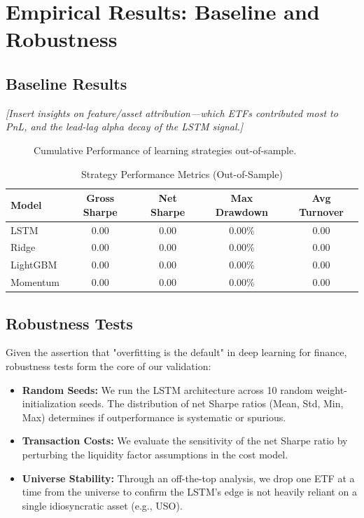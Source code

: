 \documentclass[a4paper,oneside]{scrbook}
\begin{document}
\section{Empirical Results: Baseline and Robustness}

\subsection{Baseline Results}
\textit{[Insert insights on feature/asset attribution—which ETFs contributed most to PnL, and the lead-lag alpha decay of the LSTM signal.]}

\begin{figure}[htbp]
  \centering
  \caption{Cumulative Performance of learning strategies out-of-sample.}
  \label{fig:pnl}
\end{figure}

\begin{table}[h]
\centering
\caption{Strategy Performance Metrics (Out-of-Sample)}
\begin{tabular}{lcccc}
\toprule
\textbf{Model} & \textbf{Gross Sharpe} & \textbf{Net Sharpe} & \textbf{Max Drawdown} & \textbf{Avg Turnover} \\
\midrule
LSTM & 0.00 & 0.00 & 0.00\% & 0.00 \\
Ridge & 0.00 & 0.00 & 0.00\% & 0.00 \\
LightGBM & 0.00 & 0.00 & 0.00\% & 0.00 \\
Momentum & 0.00 & 0.00 & 0.00\% & 0.00 \\
\bottomrule
\end{tabular}
\end{table}

\subsection{Robustness Tests}
Given the assertion that "overfitting is the default" in deep learning for finance, robustness tests form the core of our validation:
\begin{itemize}
    \item \textbf{Random Seeds:} We run the LSTM architecture across 10 random weight-initialization seeds. The distribution of net Sharpe ratios (Mean, Std, Min, Max) determines if outperformance is systematic or spurious.
    \item \textbf{Transaction Costs:} We evaluate the sensitivity of the net Sharpe ratio by perturbing the liquidity factor assumptions in the cost model.
    \item \textbf{Universe Stability:} Through an off-the-top analysis, we drop one ETF at a time from the universe to confirm the LSTM's edge is not heavily reliant on a single idiosyncratic asset (e.g., USO).
\end{itemize}
\end{document}
